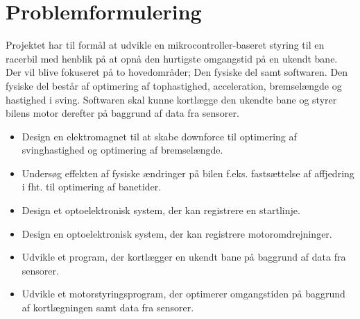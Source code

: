 
\section{Problemformulering}

Projektet har til formål at udvikle en mikrocontroller-baseret styring til en racerbil med henblik på at opnå den hurtigste omgangstid på en ukendt bane.
Der vil blive fokuseret på to hovedområder; Den fysiske del samt softwaren. Den fysiske del består af optimering af tophastighed, acceleration, bremselængde og hastighed i sving.
Softwaren skal kunne kortlægge den ukendte bane og styrer bilens motor derefter på baggrund af data fra sensorer.

\begin{itemize}
	\item Design en elektromagnet til at skabe downforce til optimering af svinghastighed og optimering af bremselængde.
	\item Undersøg effekten af fysiske ændringer på bilen f.eks. fastsættelse af affjedring i fht. til optimering af banetider.
	\item Design et optoelektronisk system, der kan registrere en startlinje.
	\item Design en optoelektronisk system, der kan registrere motoromdrejninger.
	\item Udvikle et program, der kortlægger en ukendt bane på baggrund af data fra sensorer.
	\item Udvikle et motorstyringsprogram, der optimerer omgangstiden på baggrund af kortlægningen samt data fra sensorer.
\end{itemize}
